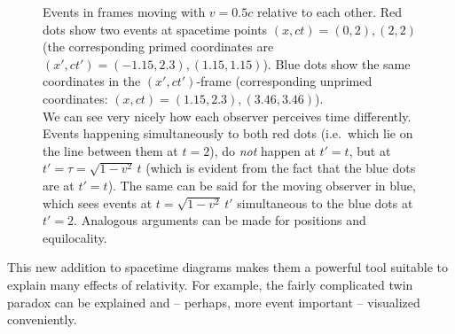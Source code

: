 





\begin{figure}
	\centering
	
	
	\caption{Events in frames moving with $v = 0.5 c$ relative to each other. Red dots show two events at spacetime points $(x, ct) = (0,2), (2,2)$ (the corresponding primed coordinates are $(x', ct') = (-1.15, 2.3), (1.15, 1.15)$). Blue dots show the same coordinates in the $(x', ct')$-frame (corresponding unprimed coordinates: $(x, ct) = (1.15, 2.3), (3.46, 3.46)$).\\
	We can see very nicely how each observer perceives time differently. Events happening simultaneously to both red dots (i.e.~which lie on the line between them at $t = 2$), do \emph{not} happen at $t' = t$, but at $t' = \tau = \sqrt{1 - v^2} \, t$ (which is evident from the fact that the blue dots are at $t' = t$). The same can be said for the moving observer in blue, which sees events at $t = \sqrt{1 - v^2} \, t'$ simultaneous to the blue dots at $t' = 2$. Analogous arguments can be made for positions and equilocality.}
	\label{fig:spacetime_diagram_two_observers}
\end{figure}



This new addition to spacetime diagrams makes them a powerful tool suitable to explain many effects of relativity. For example, the fairly complicated twin paradox can be explained and -- perhaps, more event important -- visualized conveniently.

